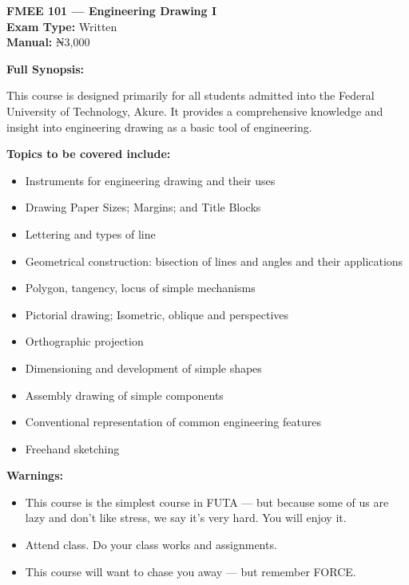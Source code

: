 \documentclass[11pt,a4paper]{article}
\begin{document}
\begin{coursebox}
    \textbf{\color{primary}\Large FMEE 101 --- Engineering Drawing I}\\[0.3em]
    \textbf{Exam Type:} Written \\
    \textbf{Manual:} ₦3,000

    \vspace{0.8em}

    \textbf{Full Synopsis:}

    This course is designed primarily for all students admitted into the Federal University of Technology, Akure. It provides a comprehensive knowledge and insight into engineering drawing as a basic tool of engineering.

    \textbf{Topics to be covered include:}
    \begin{itemize}[leftmargin=1.5em, itemsep=0.2em]
        \item Instruments for engineering drawing and their uses
        \item Drawing Paper Sizes; Margins; and Title Blocks
        \item Lettering and types of line
        \item Geometrical construction: bisection of lines and angles and their applications
        \item Polygon, tangency, locus of simple mechanisms
        \item Pictorial drawing; Isometric, oblique and perspectives
        \item Orthographic projection
        \item Dimensioning and development of simple shapes
        \item Assembly drawing of simple components
        \item Conventional representation of common engineering features
        \item Freehand sketching
    \end{itemize}

    \vspace{0.8em}

    \textbf{\color{warningText}Warnings:}
    \begin{itemize}[leftmargin=1.5em, itemsep=0.2em]
        \item This course is the simplest course in FUTA --- but because some of us are lazy and don't like stress, we say it's very hard. You will enjoy it.
        \item Attend class. Do your class works and assignments.
        \item This course will want to chase you away --- but remember FORCE.
    \end{itemize}
\end{coursebox}
\end{document}
